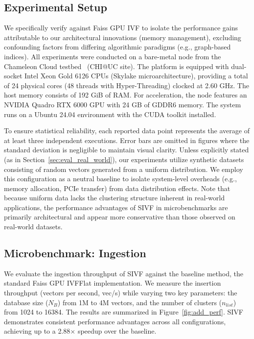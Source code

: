 \documentclass[sigconf,nonacm]{acmart}
\theoremstyle{plain}
\theoremstyle{definition}
\theoremstyle{remark}
\begin{document}
\subsection{Experimental Setup}
\label{sec:exp_setup}

We specifically verify against Faiss GPU IVF to isolate the performance gains attributable to our architectural innovations (memory management), excluding confounding factors from differing algorithmic paradigms (e.g., graph-based indices). All experiments were conducted on a bare-metal node from the Chameleon Cloud testbed~\cite{keahey2020lessons} (CHI@UC site). The platform is equipped with dual-socket Intel Xeon Gold 6126 CPUs (Skylake microarchitecture), providing a total of 24 physical cores (48 threads with Hyper-Threading) clocked at 2.60 GHz. The host memory consists of 192 GiB of RAM. 
For acceleration, the node features an NVIDIA Quadro RTX 6000 GPU with 24 GB of GDDR6 memory. The system runs on a Ubuntu 24.04 environment with the CUDA toolkit installed. 

To ensure statistical reliability, each reported data point represents the average of at least three independent executions. Error bars are omitted in figures where the standard deviation is negligible to maintain visual clarity. 
Unless explicitly stated (as in Section~\ref{sec:eval_real_world}), our experiments utilize synthetic datasets consisting of random vectors generated from a uniform distribution. We employ this configuration as a neutral baseline to isolate system-level overheads (e.g., memory allocation, PCIe transfer) from data distribution effects. Note that because uniform data lacks the clustering structure inherent in real-world applications, the performance advantages of SIVF in microbenchmarks are primarily architectural and appear more conservative than those observed on real-world datasets.

\subsection{Microbenchmark: Ingestion}
\label{sec:eval_add_performance}

We evaluate the ingestion throughput of SIVF against the baseline method, the standard Faiss GPU IVFFlat implementation. We measure the insertion throughput (vectors per second, vec/s) while varying two key parameters: the database size ($N_B$) from 1M to 4M vectors, and the number of clusters ($n_{list}$) from 1024 to 16384.
The results are summarized in Figure~\ref{fig:add_perf}. SIVF demonstrates consistent performance advantages across all configurations, achieving up to a 2.88$\times$ speedup over the baseline.
\end{document}
